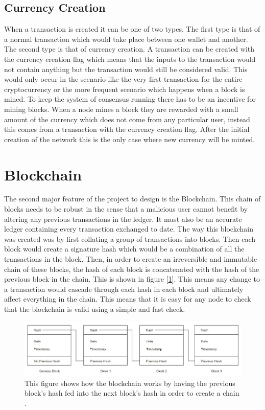 \documentclass{l4proj}
\begin{document}
\subsection{Currency Creation}
When a transaction is created it can be one of two types. The first type is that of a normal transaction which would take place
between one wallet and another. The second type is that of currency creation. A transaction can be created with the 
currency creation flag which means that the inputs to the transaction would not contain anything but the transaction
would still be considered valid. This would only occur in the scenario like the very first transaction for the entire
cryptocurrency or the more frequent scenario which happens when a block is mined. To keep the system of consensus 
running there has to be an incentive for mining blocks. When a node mines a block they are rewarded with a small
amount of the currency which does not come from any particular user, instead this comes from a transaction with the
currency creation flag. After the initial creation of the network this is the only case where new currency will be
minted.

\section{Blockchain}
\label{sec:desblockchain}
The second major feature of the project to design is the Blockchain. This chain of blocks needs to be robust in
the sense that a malicious user cannot benefit by altering any previous transactions in the ledger. It must
also be an accurate ledger containing every transaction exchanged to date. The way this blockchain was created was
by first collating a group of transactions into blocks. Then each block would create a signature hash which would
be a combination of all the transactions in the block. Then, in order to create an irreversible and immutable chain
of these blocks, the hash of each block is concatenated with the hash of the previous block in the chain. This is
shown in figure [\ref{fig:blockchainDiagram}]. This means
any change to a transaction would cascade through each hash in each block and ultimately affect everything in the
chain. This means that it is easy for any node to check that the blockchain is valid using a simple and fast check.

\begin{figure}[!ht]
    \centering
    \includegraphics[width=1\linewidth]{images/blockchaindiagram.png}    

    \caption{
        This figure shows how the blockchain works by having the previous block's hash fed into the next
        block's hash in order to create a chain \citep{blockchainimage}.
    }
    \label{fig:blockchainDiagram} 
\end{figure}
\end{document}
